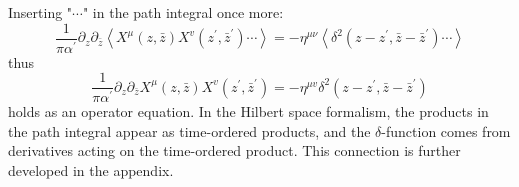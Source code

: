 Inserting "$\cdots$" in the path integral once more:    
\begin{equation}
	\frac{1}{\pi \alpha^{\prime}} \partial_{z} \partial_{\bar{z}}\left\langle X^{\mu}(z, \bar{z}) X^{v}(z^{\prime}, \bar{z}^{\prime}) \cdots\right\rangle=-\eta^{\mu \nu}\left\langle\delta^{2}(z-z^{\prime}, \bar{z}-\bar{z}^{\prime}) \cdots\right\rangle
\end{equation}
thus    
\begin{equation}
	\frac{1}{\pi \alpha^{\prime}} \partial_{z} \partial_{\bar{z}} X^{\mu}(z, \bar{z}) X^{v}(z^{\prime}, \bar{z}^{\prime})=-\eta^{\mu v} \delta^{2}(z-z^{\prime}, \bar{z}-\bar{z}^{\prime}) \label{2.1.20}
\end{equation}
holds as an operator equation.    
In the Hilbert space formalism, the products in the path integral appear as time-ordered products, and the $\delta$-function comes from derivatives acting on the time-ordered product. This connection is further developed in the appendix.    

